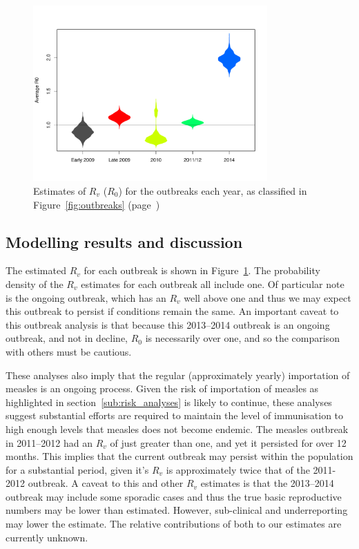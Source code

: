 \documentclass{article}
\begin{document}
\begin{figure}
     \centering
     \includegraphics[width=0.8\textwidth]{averageR0.pdf}
     \caption{Estimates of $R_v$ ($R_0$) for the outbreaks each year, as classified in Figure~\ref{fig:outbreaks} (page~\pageref{fig:outbreaks})}
     \label{fig:r0}
\end{figure}

\subsection{Modelling results and discussion}

The estimated $R_v$ for each outbreak is shown in Figure~\ref{fig:r0}. The probability density of the $R_v$ estimates for each outbreak all include one. Of particular note is the ongoing outbreak, which has an $R_v$ well above one and thus we may expect this outbreak to persist if conditions remain the same. An important caveat to this outbreak analysis is that because this 2013--2014 outbreak is an ongoing outbreak, and not in decline, $R_0$ is necessarily over one, and so the comparison with others must be cautious.

These analyses also imply that the regular (approximately yearly) importation of measles is an ongoing process. Given the risk of importation of measles as highlighted in section~\ref{sub:risk_analyses} is likely to continue, these analyses suggest substantial efforts are required to maintain the level of immunisation to high enough levels that measles does not become endemic. The measles outbreak in 2011--2012 had an $R_v$ of just greater than one, and yet it persisted for over 12 months. This implies that the current outbreak may persist within the population for a substantial period, given it's $R_v$ is approximately twice that of the 2011-2012 outbreak. A caveat to this and other $R_v$ estimates is that the 2013--2014 outbreak may include some sporadic cases and thus the true basic reproductive numbers may be lower than estimated. However, sub-clinical and underreporting may lower the estimate. The relative contributions of both to our estimates are currently unknown.
\end{document}
